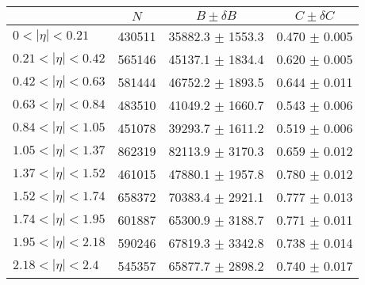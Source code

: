 \begin{tabular}{lccc}
\hline
    &   $N$   & $B \pm \delta B$  &  $C \pm \delta C$ \\
\hline
$0 < |\eta| <0.21$             & 430511     & 35882.3    $\pm$ 1553.3 & 0.470      $\pm$ 0.005 \\
$0.21 < |\eta| <0.42$          & 565146     & 45137.1    $\pm$ 1834.4 & 0.620      $\pm$ 0.005 \\
$0.42 < |\eta| <0.63$          & 581444     & 46752.2    $\pm$ 1893.5 & 0.644      $\pm$ 0.011 \\
$0.63 < |\eta| <0.84$          & 483510     & 41049.2    $\pm$ 1660.7 & 0.543      $\pm$ 0.006 \\
$0.84 < |\eta| <1.05$          & 451078     & 39293.7    $\pm$ 1611.2 & 0.519      $\pm$ 0.006 \\
$1.05 < |\eta| <1.37$          & 862319     & 82113.9    $\pm$ 3170.3 & 0.659      $\pm$ 0.012 \\
$1.37 < |\eta| <1.52$          & 461015     & 47880.1    $\pm$ 1957.8 & 0.780      $\pm$ 0.012 \\
$1.52 < |\eta| <1.74$          & 658372     & 70383.4    $\pm$ 2921.1 & 0.777      $\pm$ 0.013 \\
$1.74 < |\eta| <1.95$          & 601887     & 65300.9    $\pm$ 3188.7 & 0.771      $\pm$ 0.011 \\
$1.95 < |\eta| <2.18$          & 590246     & 67819.3    $\pm$ 3342.8 & 0.738      $\pm$ 0.014 \\
$2.18 < |\eta| <2.4$           & 545357     & 65877.7    $\pm$ 2898.2 & 0.740      $\pm$ 0.017 \\
\hline
\end{tabular}
